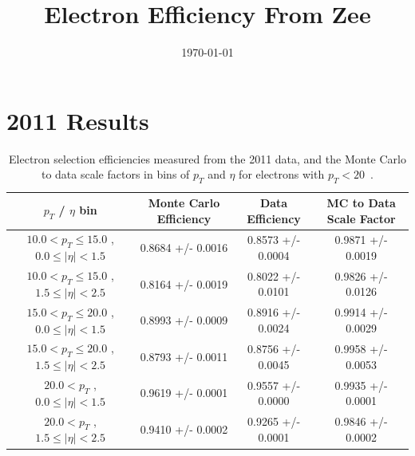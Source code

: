 \documentclass{cmspaper}
\begin{document}
\begin{titlepage}


  \date{\today}

  \title{Electron Efficiency From Zee}

  

  \begin{abstract}
  
  \end{abstract} 

\end{titlepage}
\tableofcontents
\newpage 


\section{2011 Results}


 \begin{table}[!ht]
 \begin{center} 
 \begin{tabular}{|c|c|c|c|}
 \hline
 $p_{T}$ / $\eta$ bin    &  Monte Carlo Efficiency    &  Data Efficiency   &  MC to Data Scale Factor \\   \hline           
\hline
$ 10.0 < p_{T} \le  15.0$ , $  0.0  \le |\eta| <   1.5$   &       0.8684 +/- 0.0016   &       0.8573 +/- 0.0004   &       0.9871 +/- 0.0019   \\   
\hline
$ 10.0 < p_{T} \le  15.0$ , $  1.5  \le |\eta| <   2.5$   &       0.8164 +/- 0.0019   &       0.8022 +/- 0.0101   &       0.9826 +/- 0.0126   \\   
\hline
$ 15.0 < p_{T} \le  20.0$ , $  0.0  \le |\eta| <   1.5$   &       0.8993 +/- 0.0009   &       0.8916 +/- 0.0024   &       0.9914 +/- 0.0029   \\   
\hline
$ 15.0 < p_{T} \le  20.0$ , $  1.5  \le |\eta| <   2.5$   &       0.8793 +/- 0.0011   &       0.8756 +/- 0.0045   &       0.9958 +/- 0.0053   \\   
\hline
$ 20.0 < p_{T} $ , $  0.0  \le |\eta| <   1.5$   &       0.9619 +/- 0.0001   &       0.9557 +/- 0.0000   &       0.9935 +/- 0.0001   \\   
\hline
$ 20.0 < p_{T} $ , $  1.5  \le |\eta| <   2.5$   &       0.9410 +/- 0.0002   &       0.9265 +/- 0.0001   &       0.9846 +/- 0.0002   \\   
\hline
\end{tabular}
\caption{Electron selection efficiencies measured from the 2011 data, and the 
Monte Carlo to data scale factors in bins of $p_{T}$ and $\eta$ for electrons with $p_{T}<20$~\GeV.}
\label{tab:eff_ele_selection_lowpt}
\end{center}
\end{table}
\end{document}
